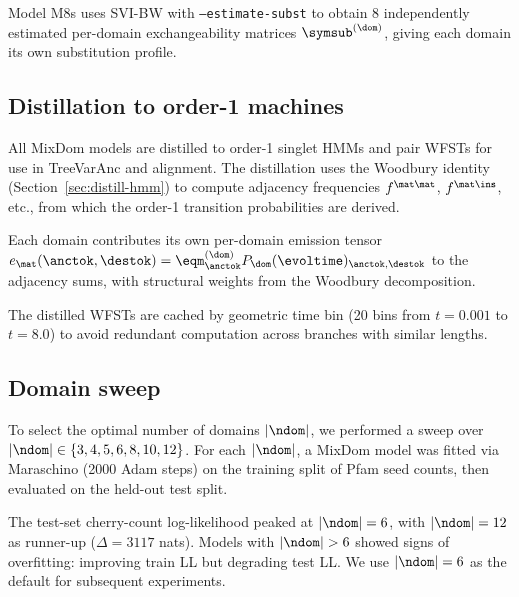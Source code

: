 Model M8s uses SVI-BW with \texttt{--estimate-subst} to obtain
8 independently estimated per-domain exchangeability matrices
$\symsub^{(\dom)}$, giving each domain its own substitution profile.

\subsection{Distillation to order-1 machines}
\label{sec:distillation-pipeline}

All MixDom models are distilled to order-1 singlet HMMs and pair WFSTs
for use in TreeVarAnc and alignment.
The distillation uses the Woodbury identity
(Section~\ref{sec:distill-hmm}) to compute adjacency frequencies
$f^{\mat\mat}$, $f^{\mat\ins}$, etc., from which the order-1
transition probabilities are derived.

Each domain contributes its own per-domain emission tensor
$e_{\mat}(\anctok, \destok) = \eqm^{(\dom)}_\anctok P_\dom(\evoltime)_{\anctok,\destok}$
to the adjacency sums, with structural weights from the Woodbury decomposition.

The distilled WFSTs are cached by geometric time bin
(20 bins from $t = 0.001$ to $t = 8.0$) to avoid redundant
computation across branches with similar lengths.

\subsection{Domain sweep}
\label{sec:domain-sweep}

To select the optimal number of domains $|\ndom|$, we performed
a sweep over $|\ndom| \in \{3, 4, 5, 6, 8, 10, 12\}$.
For each $|\ndom|$, a MixDom model was fitted via Maraschino
(2000 Adam steps) on the training split of Pfam seed counts,
then evaluated on the held-out test split.

The test-set cherry-count log-likelihood peaked at $|\ndom| = 6$,
with $|\ndom| = 12$ as runner-up ($\Delta = 3117$ nats).
Models with $|\ndom| > 6$ showed signs of overfitting:
improving train LL but degrading test LL.
We use $|\ndom| = 6$ as the default for subsequent experiments.
